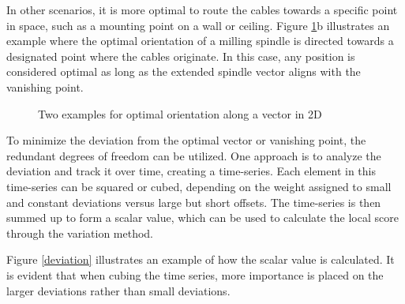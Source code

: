 In other scenarios, it is more optimal to route the cables towards a specific point in space, such as a mounting point on a wall or ceiling. Figure \ref{OOPti}b illustrates an example where the optimal orientation of a milling spindle is directed towards a designated point where the cables originate. In this case, any position is considered optimal as long as the extended spindle vector aligns with the vanishing point.


\begin{figure}[H]%
	\centering
	\qquad
	\caption{Two examples for optimal orientation along a vector in 2D}%
	\label{OOPti}%
\end{figure}



To minimize the deviation from the optimal vector or vanishing point, the redundant degrees of freedom can be utilized. One approach is to analyze the deviation and track it over time, creating a time-series. Each element in this time-series can be squared or cubed, depending on the weight assigned to small and constant deviations versus large but short offsets. The time-series is then summed up to form a scalar value, which can be used to calculate the local score through the variation method.


Figure \ref{deviation} illustrates an example of how the scalar value is calculated. It is evident that when cubing the time series, more importance is placed on the larger deviations rather than small deviations.


